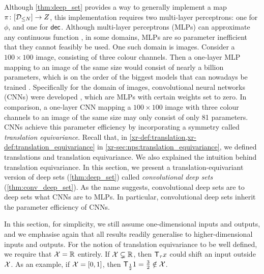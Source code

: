 \documentclass[12pt, twoside]{report}
\newcommand{\xrprefix}[1]{xr-#1}
\begin{document}
Although \cref{thm:deep_set} provides a way to generally implement a map $\pi\colon[\mathcal{D}_{\le N}] \to Z$, this implementation requires two multi-layer perceptrons: one for $\phi$, and one for $\mathsf{dec}$.
Although multi-layer perceptrons (MLPs) can approximate any continuous function \parencite{Cybenko:1989:Approximation_by_Superpositions_of_a},
in some domains, MLPs are so parameter inefficient that they cannot feasibly be used.
One such domain is images.
Consider a $100\times100$ image, consisting of three colour channels. 
Then a one-layer MLP mapping to an image of the same size would consist of nearly a billion parameters, which is on the order of the biggest models that can nowadays be trained \parencite{Brown:2020:Language_Models_Are_Few-Shot_Learners}.
Specifically for the domain of images, convolutional neural networks (CNNs) were developed \parencite{Fukushima:1982:Neocognitron_A_Self-Organizing_Neural_Network}, which are MLPs with certain weights set to zero.
In comparison, a one-layer CNN mapping a $100\times100$ image with three colour channels to an image of the same size may only consist of only 81 parameters.
CNNs achieve this parameter efficiency by incorporating a symmetry called \emph{translation equivariance}.
Recall that, in \cref{\xrprefix{def:translation},\xrprefix{def:translation_equivariance}} in \cref{\xrprefix{sec:nps:translation_equivariance}}, we defined translations and translation equivariance.
We also explained the intuition behind translation equivariance.
In this section, we present a translation-equivariant version of deep sets (\cref{thm:deep_set}) called \emph{convolutional deep sets} (\cref{thm:conv_deep_set}).
As the name suggests, convolutional deep sets are to deep sets what CNNs are to MLPs.
In particular, convolutional deep sets inherit the parameter efficiency of CNNs.

In this section, for simplicity, we still assume one-dimensional inputs and outputs,
and we emphasise again that all results readily generalise to higher-dimensional inputs and outputs.
For the notion of translation equivariance to be well defined, we require that $\mathcal{X} = \mathbb{R}$ entirely.
If $\mathcal{X} \subsetneq \mathbb{R}$, then $\T_\tau x$ could shift an input outside $\mathcal{X}$.
As an example, if $\mathcal{X} = [0, 1]$, then $\T_{\frac12} 1 = \tfrac32 \notin \X$.
\end{document}
